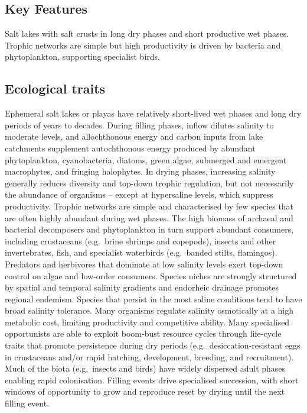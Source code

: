 \documentclass[
  letterpaper,
  DIV=11,
  numbers=noendperiod]{scrartcl}
\begin{document}
\subsection{Key Features}\label{key-features-123}

Salt lakes with salt crusts in long dry phases and short productive wet
phases. Trophic networks are simple but high productivity is driven by
bacteria and phytoplankton, supporting specialist birds.

\subsection{Ecological traits}\label{ecological-traits-123}

Ephemeral salt lakes or playas have relatively short-lived wet phases
and long dry periods of years to decades. During filling phases, inflow
dilutes salinity to moderate levels, and allochthonous energy and carbon
inputs from lake catchments supplement autochthonous energy produced by
abundant phytoplankton, cyanobacteria, diatoms, green algae, submerged
and emergent macrophytes, and fringing halophytes. In drying phases,
increasing salinity generally reduces diversity and top-down trophic
regulation, but not necessarily the abundance of organisms -- except at
hypersaline levels, which suppress productivity. Trophic networks are
simple and characterised by few species that are often highly abundant
during wet phases. The high biomass of archaeal and bacterial
decomposers and phytoplankton in turn support abundant consumers,
including crustaceans (e.g.~brine shrimps and copepods), insects and
other invertebrates, fish, and specialist waterbirds (e.g.~banded
stilts, flamingos). Predators and herbivores that dominate at low
salinity levels exert top-down control on algae and low-order consumers.
Species niches are strongly structured by spatial and temporal salinity
gradients and endorheic drainage promotes regional endemism. Species
that persist in the most saline conditions tend to have broad salinity
tolerance. Many organisms regulate salinity osmotically at a high
metabolic cost, limiting productivity and competitive ability. Many
specialised opportunists are able to exploit boom-bust resource cycles
through life-cycle traits that promote persistence during dry periods
(e.g.~desiccation-resistant eggs in crustaceans and/or rapid hatching,
development, breeding, and recruitment). Much of the biota (e.g.~insects
and birds) have widely dispersed adult phases enabling rapid
colonisation. Filling events drive specialised succession, with short
windows of opportunity to grow and reproduce reset by drying until the
next filling event.
\end{document}

